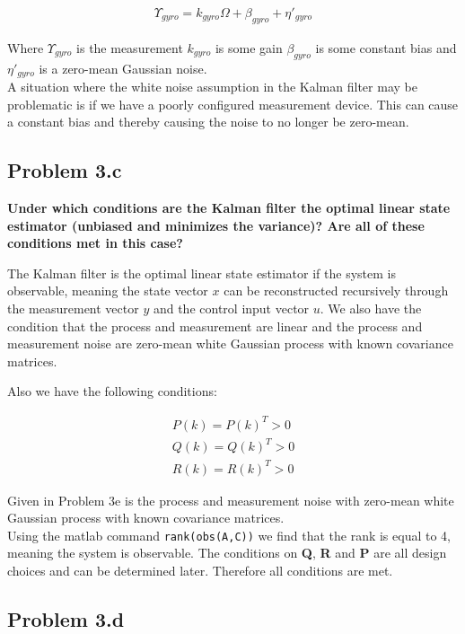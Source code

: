 \begin{align}
    \Upsilon_{gyro} = k_{gyro}\Omega + \beta_{gyro} + \eta'_{gyro}
\end{align}

Where $\Upsilon_{gyro}$ is the measurement $k_{gyro}$ is some gain $\beta_{gyro}$ is some constant bias and $\eta'_{gyro}$ is a zero-mean Gaussian noise. \\

A situation where the white noise assumption in the Kalman filter may be problematic is if we have a poorly configured measurement device. This can cause a constant bias and thereby causing the noise to no longer be zero-mean. \\

\subsection*{Problem 3.c}
\textbf{Under which conditions are the Kalman filter the optimal linear state estimator (unbiased and
minimizes the variance)? Are all of these conditions met in this case?}

The Kalman filter is the optimal linear state estimator if the system is observable, meaning the state vector $x$ can be reconstructed recursively through the measurement vector $y$ and the control input vector $u$. We also have the condition that the process and measurement are linear and the process and measurement noise are zero-mean white Gaussian process with known covariance matrices. 

Also we have the following conditions:

\begin{align}
    P(k) = P(k)^T > 0 \\
    Q(k) = Q(k)^T > 0 \\
    R(k) = R(k)^T > 0 
\end{align}

Given in Problem 3e is the process and measurement noise with zero-mean white Gaussian process with known covariance matrices. \\ 

Using the matlab command \texttt{rank(obs(A,C))} we find that the rank is equal to 4, meaning the system is observable. The conditions on \textbf{Q}, \textbf{R} and \textbf{P} are all design choices and can be determined later. Therefore all conditions are met. 

\subsection*{Problem 3.d}


